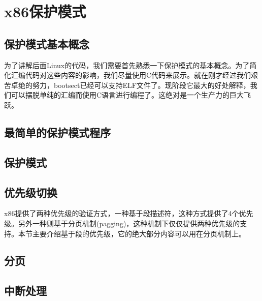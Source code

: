 \chapter{x86保护模式}
\section{保护模式基本概念}
为了讲解后面Linux的代码，我们需要首先熟悉一下保护模式的基本概念。为了简化汇编代码对这些内容的影响，我们尽量使用C代码来展示。就在刚才经过我们艰苦卓绝的努力，bootsect已经可以支持ELF文件了。现阶段它最大的好处解释，我们可以摆脱单纯的汇编而使用C语言进行编程了。这绝对是一个生产力的巨大飞跃。

\section{最简单的保护模式程序}

\section{保护模式}



\section{优先级切换}
x86提供了两种优先级的验证方式，一种基于段描述符，这种方式提供了4个优先级。另外一种则基于分页机制(pagging)，这种机制下仅仅提供两种优先级的支持。本节主要介绍基于段的优先级，它的绝大部分内容可以用在分页机制上。
\section{分页}
\section{中断处理}



